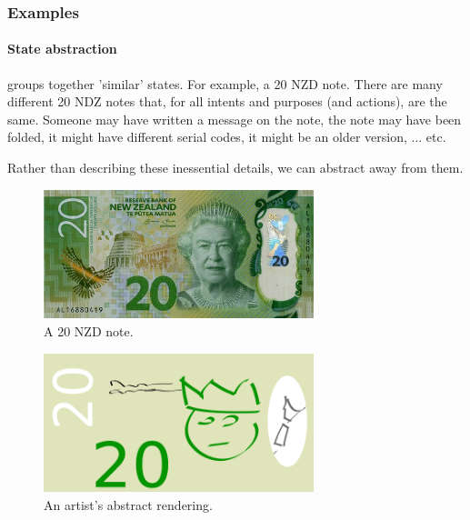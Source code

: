 


\subsubsection{Examples}

\paragraph{State abstraction} groups together 'similar' states. For example, a 20 NZD note.
There are many different 20 NDZ notes that, for all intents and purposes (and actions), are the same.
Someone may have written a message on the note, the note may have been folded,
it might have different serial codes, it might be an older version, ... etc.

Rather than describing these inessential details, we can abstract away from them.

\begin{figure}[h!]
\centering
\includegraphics[width=0.7\textwidth,height=0.2\textheight]{../../pictures/images/nz20.png}
\caption{A 20 NZD note.}
\end{figure}

\begin{figure}[h!]
\centering
\includegraphics[width=0.7\textwidth,height=0.2\textheight]{../../pictures/drawings/my-nz20.png}
\caption{An artist's abstract rendering.}
\end{figure}

